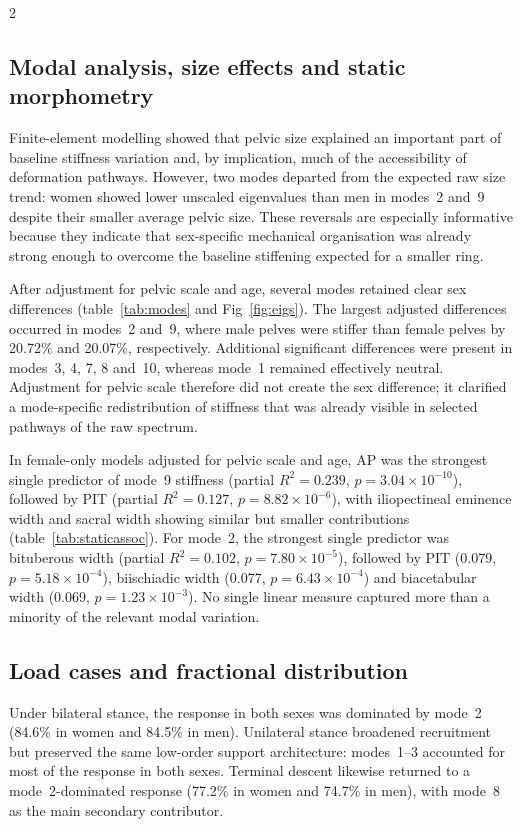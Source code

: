 \documentclass[openacc]{rsproca_new}
\begin{document}
\begin{multicols}{2}
\subsection{Modal analysis, size effects and static morphometry}

Finite-element modelling showed that pelvic size explained an important part of baseline stiffness variation and, by implication, much of the accessibility of deformation pathways. However, two modes departed from the expected raw size trend: women showed lower unscaled eigenvalues than men in modes~2 and~9 despite their smaller average pelvic size. These reversals are especially informative because they indicate that sex-specific mechanical organisation was already strong enough to overcome the baseline stiffening expected for a smaller ring.

After adjustment for pelvic scale and age, several modes retained clear sex differences (table~\ref{tab:modes} and Fig~\ref{fig:eigs}). The largest adjusted differences occurred in modes~2 and~9, where male pelves were stiffer than female pelves by 20.72\% and 20.07\%, respectively. Additional significant differences were present in modes~3, 4, 7, 8 and~10, whereas mode~1 remained effectively neutral. Adjustment for pelvic scale therefore did not create the sex difference; it clarified a mode-specific redistribution of stiffness that was already visible in selected pathways of the raw spectrum.

In female-only models adjusted for pelvic scale and age, AP was the strongest single predictor of mode~9 stiffness (partial $R^2=0.239$, $p=3.04 \times 10^{-10}$), followed by PIT (partial $R^2=0.127$, $p=8.82 \times 10^{-6}$), with iliopectineal eminence width and sacral width showing similar but smaller contributions (table~\ref{tab:staticassoc}). For mode~2, the strongest single predictor was bituberous width (partial $R^2=0.102$, $p=7.80 \times 10^{-5}$), followed by PIT (0.079, $p=5.18 \times 10^{-4}$), biischiadic width (0.077, $p=6.43 \times 10^{-4}$) and biacetabular width (0.069, $p=1.23 \times 10^{-3}$). No single linear measure captured more than a minority of the relevant modal variation.

\subsection{Load cases and fractional distribution}

Under bilateral stance, the response in both sexes was dominated by mode~2 (84.6\% in women and 84.5\% in men). Unilateral stance broadened recruitment but preserved the same low-order support architecture: modes~1--3 accounted for most of the response in both sexes. Terminal descent likewise returned to a mode~2-dominated response (77.2\% in women and 74.7\% in men), with mode~8 as the main secondary contributor.


\end{multicols}
\end{document}
